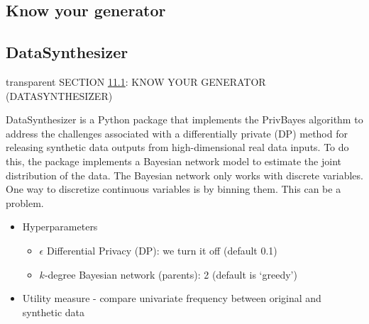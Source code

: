 \documentclass[t,8pt,utfx8]{beamer}
\begin{document}
\begin{spacing}{1.25}
\section{Know your generator}\label{sec:sdg}
\subsection{DataSynthesizer}\label{sec:sdg_datasynthesizer}
\begin{frame}[c,plain]
\vskip-4mm
\begin{beamercolorbox}[wd=\boxwidth,ht=22.11mm]{transparent}%
    \vfill%
    \leftinsert%
    \MakeUppercase{Section \ref{sec:sdg}\ref{sec:sdg_datasynthesizer}: Know your generator (DataSynthesizer)} %
\end{beamercolorbox}
\vskip-3mm

DataSynthesizer is a Python package that implements the PrivBayes algorithm to address the challenges associated with a differentially private (DP) method for releasing synthetic data outputs from high-dimensional real data inputs. To do this, the package implements a Bayesian network model to estimate the joint distribution of the data.  The Bayesian network only works with discrete variables. One way to discretize continuous variables is by binning them.  This can be a problem.

\begin{itemize}
    \item Hyperparameters
    \begin{itemize}
        \item $\epsilon$ Differential Privacy (DP): we turn it off (default 0.1)
        \item $k$-degree Bayesian network (parents): 2 (default is `greedy')
    \end{itemize}
    \item Utility measure - compare univariate frequency between original and synthetic data
\end{itemize}
\end{frame}





\end{spacing}
\end{document}
